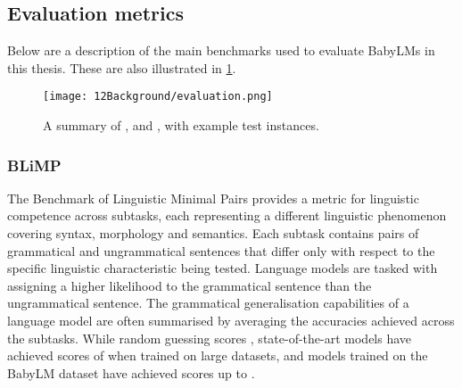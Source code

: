 
\subsection{Evaluation metrics}\label{sec:12-evaluation}

Below are a description of the main benchmarks used to evaluate BabyLMs in this thesis. These are also illustrated in \cref{fig:12-evaluation}.

\begin{figure}[t]
    \centering
    \texttt{[image: 12Background/evaluation.png]}
    \caption{A summary of \blimp, \glue and \babyslm, with example test instances.}
    \label{fig:12-evaluation}
\end{figure}

\subsubsection{BLiMP}\label{sec:12-blimp}

The Benchmark of Linguistic Minimal Pairs \citep[\blimp][]{warstadt-2020-blimp} provides a metric for linguistic competence across  subtasks, each representing a different linguistic phenomenon covering syntax, morphology and semantics. Each subtask contains  pairs of grammatical and ungrammatical sentences that differ only with respect to the specific linguistic characteristic being tested. Language models are tasked with assigning a higher likelihood to the grammatical sentence than the ungrammatical sentence. The grammatical generalisation capabilities of a language model are often summarised by averaging the accuracies achieved across the subtasks. While random guessing scores , state-of-the-art models have achieved scores of  when trained on large datasets, and models trained on the BabyLM dataset have achieved scores up to  \citep{hu-etal-2024-findings}. 

